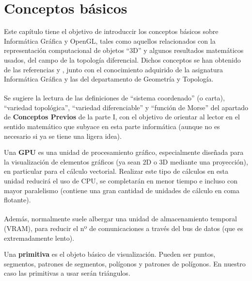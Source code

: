 
\chapter{Conceptos básicos}

Este capítulo tiene el objetivo de introduccir los conceptos básicos sobre Informática Gráfica y OpenGL, tales como aquellos relacionados con la representación computacional de objetos ``$3$D'' y algunos resultados matemáticos usados, del campo de la topología diferencial. Dichos conceptos se han obtenido de las referencias \cite{KhronosWiki} y \cite{LearnOGL}, junto con el conocimiento adquirido de la asignatura Informática Gráfica y las del departamento de Geometría y Topología.\\
\\Se sugiere la lectura de las definiciones de ``sistema coordenado'' (o carta), ``variedad topológica'', ``variedad diferenciable'' y ``función de Morse'' del apartado de \textbf{Conceptos Previos} de la parte I, con el objetivo de orientar al lector en el sentido matemático que subyace en esta parte informática (aunque no es necesario si ya se tiene una ligera idea).\\

\begin{definicion} Una \textbf{GPU} es una unidad de procesamiento gráfico, especialmente diseñada para la visualización de elementos gráficos (ya sean $2$D o $3$D mediante una proyección), en particular para el cálculo vectorial. Realizar este tipo de cálculos en esta unidad reducirá el uso de CPU, se completarán en menor tiempo e incluso con mayor paralelismo (contiene una gran cantidad de unidades de cálculo en coma flotante).\\
\\Además, normalmente suele albergar una unidad de almacenamiento temporal (VRAM), para reducir el nº de comunicaciones a través del bus de datos (que es extremadamente lento).
\end{definicion}

\begin{definicion} Una \textbf{primitiva} es el objeto básico de visualización. Pueden ser puntos, segmentos, patrones de segmentos, polígonos y patrones de polígonos. En nuestro caso las primitivas a usar serán triángulos.
\end{definicion}

